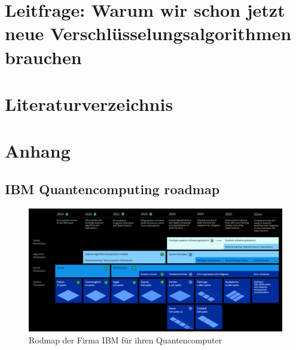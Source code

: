 \documentclass[conference]{IEEEtran}
\begin{document}
\section{Leitfrage: Warum wir schon jetzt neue Verschlüsselungsalgorithmen brauchen}


%

\section*{Literaturverzeichnis}
\printbibliography[heading=none]{}

\pagebreak
\section{Anhang}

\subsection{IBM Quantencomputing roadmap}
\begin{figure}[!hbt]
  \centering
  \includegraphics[width=\textwidth]{./images/ibm-roadmap.png}
  \caption{Rodmap der Firma IBM für ihren Quantencomputer \cite{noauthor_ibm_2015}}
  \label{fig:ibm-rm}
\end{figure}
\end{document}
